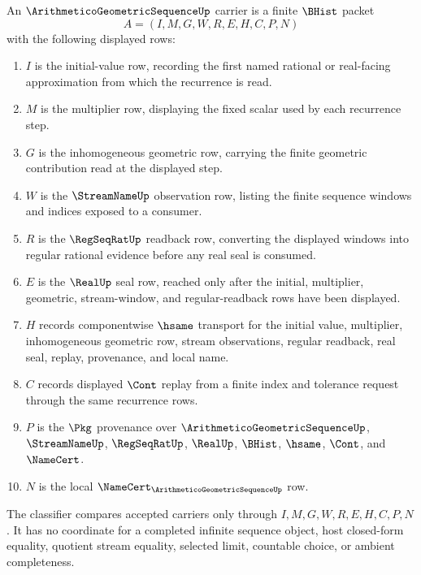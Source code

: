 \begin{definition}
\label{def:arithmetico-geometric-sequence-carrier}
An $\ArithmeticoGeometricSequenceUp$ carrier is a finite $\BHist$ packet
$$
A=(I,M,G,W,R,E,H,C,P,N)
$$
with the following displayed rows:
\begin{enumerate}
\item $I$ is the initial-value row, recording the first named rational or real-facing approximation from which the recurrence is read.
\item $M$ is the multiplier row, displaying the fixed scalar used by each recurrence step.
\item $G$ is the inhomogeneous geometric row, carrying the finite geometric contribution read at the displayed step.
\item $W$ is the $\StreamNameUp$ observation row, listing the finite sequence windows and indices exposed to a consumer.
\item $R$ is the $\RegSeqRatUp$ readback row, converting the displayed windows into regular rational evidence before any real seal is consumed.
\item $E$ is the $\RealUp$ seal row, reached only after the initial, multiplier, geometric, stream-window, and regular-readback rows have been displayed.
\item $H$ records componentwise $\hsame$ transport for the initial value, multiplier, inhomogeneous geometric row, stream observations, regular readback, real seal, replay, provenance, and local name.
\item $C$ records displayed $\Cont$ replay from a finite index and tolerance request through the same recurrence rows.
\item $P$ is the $\Pkg$ provenance over $\ArithmeticoGeometricSequenceUp$, $\StreamNameUp$, $\RegSeqRatUp$, $\RealUp$, $\BHist$, $\hsame$, $\Cont$, and $\NameCert$.
\item $N$ is the local $\NameCert_{\ArithmeticoGeometricSequenceUp}$ row.
\end{enumerate}
The classifier compares accepted carriers only through $I,M,G,W,R,E,H,C,P,N$. It has no coordinate for a completed infinite sequence object, host closed-form equality, quotient stream equality, selected limit, countable choice, or ambient completeness.
\end{definition}

